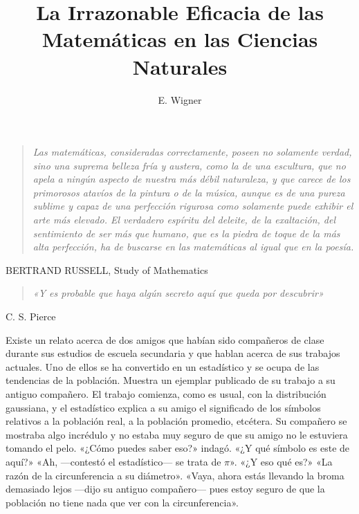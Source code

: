 \documentclass[a4paper, 12pt]{article}
\title{La Irrazonable Eficacia de las Matemáticas en las Ciencias Naturales}
\author{E. Wigner}
\date{}
\begin{document}
\begin{tcolorbox}[colback=blue!5!white,colframe=blue!75!black]

\vspace{-1.8cm}
\textbf \maketitle

\end{tcolorbox}

\bigskip


\begin{quote}

{\it Las matemáticas, consideradas correctamente, poseen no solamente verdad, sino una suprema belleza fría y austera, como la de una escultura, que no apela a ningún aspecto de nuestra más débil naturaleza, y que carece de los primorosos atavíos de la pintura o de la música, aunque es de una pureza sublime y capaz de una perfección rigurosa como solamente puede exhibir el arte más elevado. El verdadero espíritu del deleite, de la exaltación, del sentimiento de ser más que humano, que es la piedra de toque de la más alta perfección, ha de buscarse en las matemáticas al igual que en la poesía.}

\end{quote}

\hfill BERTRAND RUSSELL, Study of Mathematics


\bigskip

\begin{quote}

\textit{ «Y es probable que haya algún secreto aquí que queda por descubrir»}

\end{quote}

\hfill C. S. Pierce


\bigskip


Existe un relato acerca de dos amigos que habían sido compañeros de clase durante sus estudios de escuela secundaria y que hablan acerca de sus trabajos actuales. Uno de ellos se ha convertido en un estadístico y se ocupa de las tendencias de la población. Muestra un ejemplar publicado de su trabajo a su antiguo compañero. El trabajo comienza, como es usual, con la distribución gaussiana, y el estadístico explica a su amigo el significado de los símbolos relativos a la población real, a la población promedio, etcétera. Su compañero se mostraba algo incrédulo y no estaba muy seguro de que su amigo no le estuviera tomando el pelo. «¿Cómo puedes saber eso?» indagó. «¿Y qué símbolo es este de aquí?» «Ah, ---contestó el estadístico--- se trata de $\pi$». «¿Y eso qué es?» «La razón de la circunferencia a su diámetro». «Vaya, ahora estás llevando la broma demasiado lejos ---dijo su antiguo compañero--- pues estoy seguro de que la población no tiene nada que ver con la circunferencia».
\end{document}
